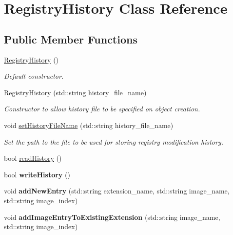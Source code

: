 \hypertarget{class_registry_history}{}\section{Registry\+History Class Reference}
\label{class_registry_history}
\subsection*{Public Member Functions}
\begin{DoxyCompactItemize}
\item 
\hypertarget{class_registry_history_ab8ca406519bf9c2383af62b655e091ec}{}\hyperlink{class_registry_history_ab8ca406519bf9c2383af62b655e091ec}{Registry\+History} ()\label{class_registry_history_ab8ca406519bf9c2383af62b655e091ec}

\begin{DoxyCompactList}\small\item\em Default constructor. \end{DoxyCompactList}\item 
\hyperlink{class_registry_history_a273475e8adc13cafd38889ef52158b9e}{Registry\+History} (std\+::string history\+\_\+file\+\_\+name)
\begin{DoxyCompactList}\small\item\em Constructor to allow history file to be specified on object creation. \end{DoxyCompactList}\item 
void \hyperlink{class_registry_history_afb10619d4c6e5b1eef4f27b11aa71ec8}{set\+History\+File\+Name} (std\+::string history\+\_\+file\+\_\+name)
\begin{DoxyCompactList}\small\item\em Set the path to the file to be used for storing registry modification history. \end{DoxyCompactList}\item 
bool \hyperlink{class_registry_history_a2a81ef9ef2d13fba16c4596a5e24409b}{read\+History} ()
\item 
\hypertarget{class_registry_history_ad05f552791c50a88291483544f9ffb80}{}bool {\bfseries write\+History} ()\label{class_registry_history_ad05f552791c50a88291483544f9ffb80}

\item 
\hypertarget{class_registry_history_a698bd300223a56f854eaba6ad3dc46e3}{}void {\bfseries add\+New\+Entry} (std\+::string extension\+\_\+name, std\+::string image\+\_\+name, std\+::string image\+\_\+index)\label{class_registry_history_a698bd300223a56f854eaba6ad3dc46e3}

\item 
\hypertarget{class_registry_history_aca5999e9204041a87365c903e73f1dbb}{}void {\bfseries add\+Image\+Entry\+To\+Existing\+Extension} (std\+::string image\+\_\+name, std\+::string image\+\_\+index)\label{class_registry_history_aca5999e9204041a87365c903e73f1dbb}

\end{DoxyCompactItemize}


